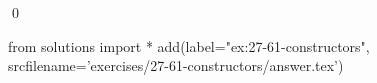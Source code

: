 
\begin{ex}
  \label{ex:27-61-constructors}
  
  \qed
\end{ex}
\begin{python0}
from solutions import *
add(label="ex:27-61-constructors",
    srcfilename='exercises/27-61-constructors/answer.tex')
\end{python0}
